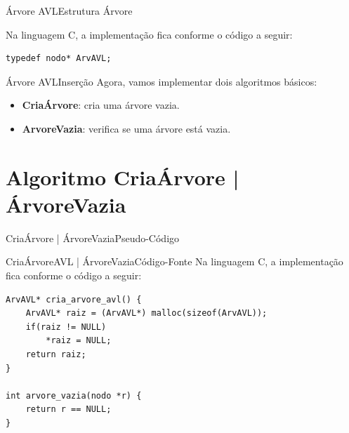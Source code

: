 \documentclass[aspectratio=169]{beamer}
\begin{document}

\begin{frame}[fragile]{Árvore AVL}{Estrutura Árvore}
\begin{algorithm}[H]
\caption{Arvore} 
\label{Arvore}
\end{algorithm} 
Na linguagem C, a implementação fica conforme o código a seguir:
\begin{lstlisting}[style=CStyle]
typedef nodo* ArvAVL;
\end{lstlisting}  

\end{frame}

\begin{frame}{Árvore AVL}{Inserção}
Agora, vamos implementar dois algoritmos básicos:
\begin{itemize}
 \item {\bf CriaÁrvore}: cria uma árvore vazia.
 \item {\bf ArvoreVazia}: verifica se uma árvore está vazia.
\end{itemize}
\end{frame}

\section{Algoritmo CriaÁrvore | ÁrvoreVazia}

\begin{frame}{CriaÁrvore | ÁrvoreVazia}{Pseudo-Código}
\begin{algorithm}[H]
\caption{CriaÁrvore} 
\label{CriaArvoreAVL}
\end{algorithm}
\begin{algorithm}[H]
\caption{ÁrvoreVazia} 
\label{ArvoreVazia}
\end{algorithm}
\end{frame}



\begin{frame}[fragile]{CriaÁrvoreAVL | ÁrvoreVazia}{Código-Fonte}
Na linguagem C, a implementação fica conforme o código a seguir:
\begin{lstlisting}[style=CStyle]
ArvAVL* cria_arvore_avl() {
    ArvAVL* raiz = (ArvAVL*) malloc(sizeof(ArvAVL));
    if(raiz != NULL)
        *raiz = NULL;
    return raiz;   
}

int arvore_vazia(nodo *r) {
    return r == NULL;
}
\end{lstlisting}  
\end{frame}
\end{document}

